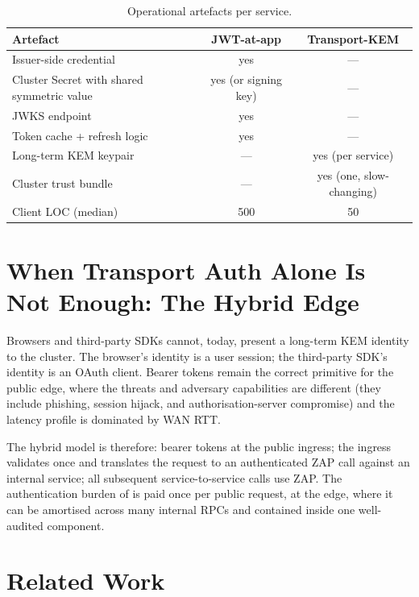 \documentclass[11pt,a4paper]{article}
\theoremstyle{plain}
\theoremstyle{definition}
\begin{document}
\begin{table}[h!]
\centering
\caption{Operational artefacts per service.}
\label{tab:artefacts}
\begin{tabular}{lcc}
\toprule
Artefact & JWT-at-app & Transport-KEM \\
\midrule
Issuer-side credential & yes & --- \\
Cluster Secret with shared symmetric value & yes (or signing key) & --- \\
JWKS endpoint & yes & --- \\
Token cache + refresh logic & yes & --- \\
Long-term KEM keypair & --- & yes (per service) \\
Cluster trust bundle & --- & yes (one, slow-changing) \\
\midrule
Client LOC (median) & 500 & 50 \\
\bottomrule
\end{tabular}
\end{table}

\section{When Transport Auth Alone Is Not Enough: The Hybrid Edge}
\label{sec:edge}

Browsers and third-party SDKs cannot, today, present a long-term KEM
identity to the cluster. The browser's identity is a user session; the
third-party SDK's identity is an OAuth client. Bearer tokens remain the
correct primitive for the public edge, where the threats and
adversary capabilities are different (they include phishing, session
hijack, and authorisation-server compromise) and the latency profile is
dominated by WAN RTT.

The hybrid model is therefore: bearer tokens at the public ingress; the
ingress validates once and translates the request to an authenticated
ZAP call against an internal service; all subsequent service-to-service
calls use ZAP. The authentication burden of  is paid
once per public request, at the edge, where it can be amortised across
many internal RPCs and contained inside one well-audited component.

\section{Related Work}
\label{sec:related}
\end{document}
